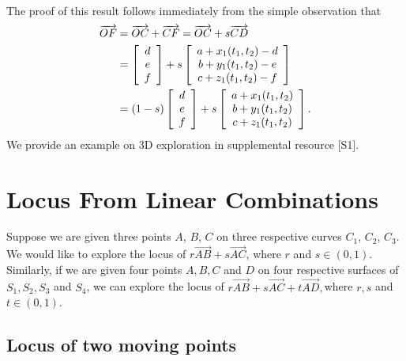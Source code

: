 \documentclass[12pt,a4paper]{article}%
\begin{document}
The proof of this result follows immediately from the simple observation that
\begin{align*}
\overrightarrow{OF}  & =\overrightarrow{OC}+\overrightarrow{CF}%
=\overrightarrow{OC}+s\overrightarrow{CD}\\
& =\left[
\begin{array}
[c]{c}%
d\\
e\\
f
\end{array}
\right]  +s\left[
\begin{array}
[c]{c}%
a+x_{1}(t_{1},t_{2})-d\\
b+y_{1}(t_{1},t_{2})-e\\
c+z_{1}(t_{1},t_{2})-f
\end{array}
\right] \\
& =(1-s)\left[
\begin{array}
[c]{c}%
d\\
e\\
f
\end{array}
\right]  +s\left[
\begin{array}
[c]{c}%
a+x_{1}(t_{1},t_{2})\\
b+y_{1}(t_{1},t_{2})\\
c+z_{1}(t_{1},t_{2})
\end{array}
\right]  .
\end{align*}
We provide an example on 3D exploration in supplemental resource [S1].

\section{Locus From Linear Combinations} \label{sec3}

Suppose we are given three points $A$, $B$, $C$ on three respective curves
$C_{1}$, $C_{2}$, $C_{3}$. We would like to explore the locus of
$r\overrightarrow{AB}+s\overrightarrow{AC}$, where $r$ and $s\in(0,1)$.
Similarly, if we are given four points $A,B,C$ and $D$ on four respective
surfaces of $S_{1},S_{2},S_{3}$ and $S_{4}$, we can explore the locus of
$r\overrightarrow{AB}+s\overrightarrow{AC}+t\overrightarrow{AD},$where $r,s$
and $t\in(0,1).$

\subsection{Locus of two moving points} \label{ssec3-1}
\end{document}
